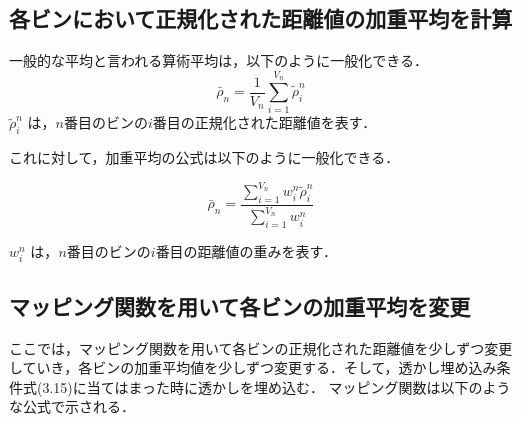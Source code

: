 \documentclass[11pt]{jreport}
\begin{document}
{\subsection{各ビンにおいて正規化された距離値の加重平均を計算}
一般的な平均と言われる算術平均は，以下のように一般化できる．
\begin{equation}
\bar{\rho}_{n}=\frac{1}{V_n} \sum_{i=1}^{V_n} \tilde{\rho}_i^n
\end{equation}
\begin{math}
\tilde{\rho}_i^n
\end{math}
は，\begin{math}n\end{math}番目のビンの\begin{math}i\end{math}番目の正規化された距離値を表す．\par


これに対して，加重平均の公式は以下のように一般化できる．



\begin{equation}
\bar{\rho}_{n}=\frac{\sum_{i=1}^{V_n} w_i^n \tilde{\rho}_i^n}{\sum_{i=1}^{V_n} w_i^n}
\end{equation}


\begin{math}
w_i^n
\end{math}
は，\begin{math}n\end{math}番目のビンの\begin{math}i\end{math}番目の距離値の重みを表す．





















\subsection{マッピング関数を用いて各ビンの加重平均を変更}
ここでは，マッピング関数を用いて各ビンの正規化された距離値を少しずつ変更していき，各ビンの加重平均値を少しずつ変更する．そして，透かし埋め込み条件式(3.15)に当てはまった時に透かしを埋め込む．
マッピング関数は以下のような公式で示される．

}
\end{document}
